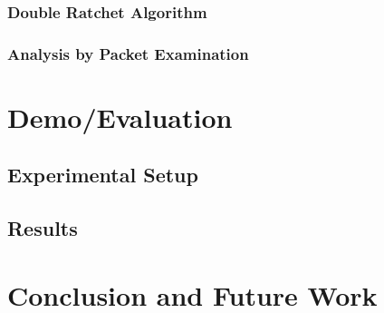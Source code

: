 \documentclass[12pt]{article}
\begin{document}
\subsubsection{Double Ratchet Algorithm}
\subsubsection{Analysis by Packet Examination}

\newpage
\section{Demo/Evaluation}
\subsection{Experimental Setup}
\par %

\subsection{Results}
\par %

\section{Conclusion and Future Work}
\par %
\end{document}
